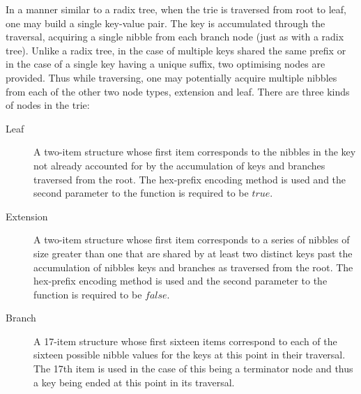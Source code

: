 \documentclass[9pt,oneside]{amsart}
\begin{document}
In a manner similar to a radix tree, when the trie is traversed from root to leaf, one may build a single key-value pair. The key is accumulated through the traversal, acquiring a single nibble from each branch node (just as with a radix tree). Unlike a radix tree, in the case of multiple keys shared the same prefix or in the case of a single key having a unique suffix, two optimising nodes are provided. Thus while traversing, one may potentially acquire multiple nibbles from each of the other two node types, extension and leaf. There are three kinds of nodes in the trie:
\begin{description}
\item[Leaf] A two-item structure whose first item corresponds to the nibbles in the key not already accounted for by the accumulation of keys and branches traversed from the root. The hex-prefix encoding method is used and the second parameter to the function is required to be $true$.
\item[Extension] A two-item structure whose first item corresponds to a series of nibbles of size greater than one that are shared by at least two distinct keys past the accumulation of nibbles keys and branches as traversed from the root. The hex-prefix encoding method is used and the second parameter to the function is required to be $false$.
\item[Branch] A 17-item structure whose first sixteen items correspond to each of the sixteen possible nibble values for the keys at this point in their traversal. The 17th item is used in the case of this being a terminator node and thus a key being ended at this point in its traversal.
\end{description}
\end{document}
